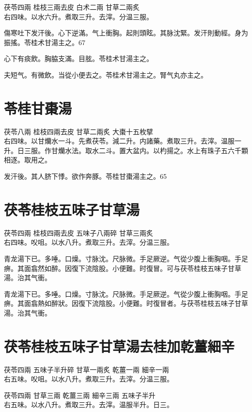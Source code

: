 茯苓{\scriptsize 四兩} 桂枝{\scriptsize 三兩去皮} 白术{\scriptsize 二兩} 甘草{\scriptsize 二兩炙}\\
右四味。以水六升。煮取三升。去滓。分温三服。

傷寒吐下发汗後。心下逆滿。气上衝胸。起則頭眩。其脉沈緊。发汗則動經。身为振搖。苓桂术甘湯主之。67

心下有痰飲。胸脇支滿。目胘。苓桂术甘湯主之。

夫短气。有微飲。当從小便去之。苓桂术甘湯主之。腎气丸亦主之。

\section{苓桂甘棗湯}

茯苓{\scriptsize 八兩} 桂枝{\scriptsize 四兩去皮} 甘草{\scriptsize 二兩炙} 大棗{\scriptsize 十五枚擘}\\
右四味。以甘爤水一斗。先煮茯苓。減二升。内諸藥。煮取三升。去滓。温服一升。日三服。作甘爤水法。取水二斗。置大盆内。以杓揚之。水上有珠子五六千顆相逐。取用之。

发汗後。其人脐下悸。欲作奔豚。苓桂甘棗湯主之。65

\section{茯苓桂枝五味子甘草湯}

茯苓{\scriptsize 四兩} 桂枝{\scriptsize 四兩去皮} 五味子{\scriptsize 八兩碎} 甘草{\scriptsize 三兩炙}\\
右四味。㕮咀。以水八升。煮取三升。去滓。分温三服。

青龙湯下已。多唾。口燥。寸脉沈。尺脉微。手足厥逆。气從少腹上衝胸咽。手足痹。其面翕然如醉。因復下流陰股。小便難。时復冒。可与茯苓桂枝五味子甘草湯。治其气衝。{\wuben}

青龙湯下已。多唾。口燥。寸脉沈。尺脉微。手足厥逆。气從少腹上衝胸咽。手足痹。其面翕熱如醉狀。因復下流陰股。小便難。时復冒者。与茯苓桂枝五味子甘草湯。治其气衝。{\dengben}

\section{茯苓桂枝五味子甘草湯去桂加乾薑細辛}

茯苓{\scriptsize 四兩} 五味子{\scriptsize 半升碎} 甘草{\scriptsize 一兩炙} 乾薑{\scriptsize 一兩} 細辛{\scriptsize 一兩}\\
右五味。㕮咀。以水八升。煮取三升。去滓。分温三服。{\wuben}

茯苓{\scriptsize 四兩} 甘草{\scriptsize 三兩} 乾薑{\scriptsize 三兩} 細辛{\scriptsize 三兩} 五味子{\scriptsize 半升}\\
右五味。以水八升。煮取三升。去滓。温服半升。日三。{\dengben}

